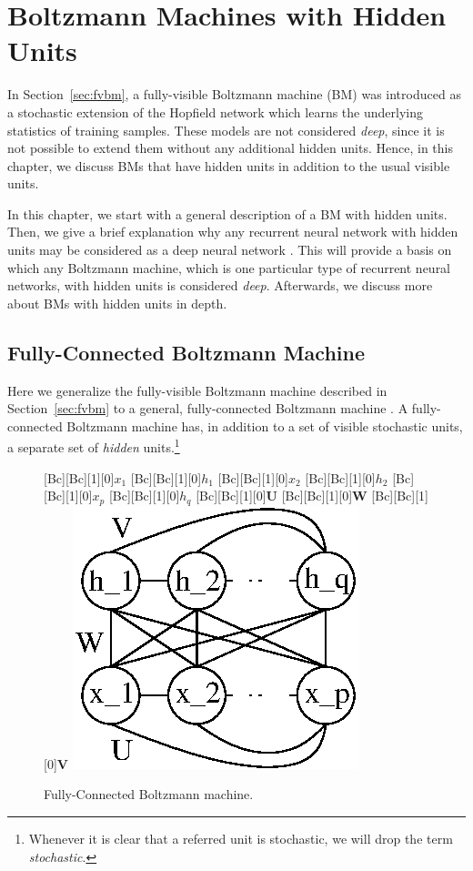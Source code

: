\documentclass{now}
\newcommand{\matr}[1]{\mathbf{#1}}
\newcommand{\mW}[0]{\matr{W}}
\newcommand{\mU}[0]{\matr{U}}
\newcommand{\mV}[0]{\matr{V}}
\begin{document}
\chapter{Boltzmann Machines with Hidden Units}
\label{chap:bm}

In Section~\ref{sec:fvbm}, a fully-visible Boltzmann machine
(BM) was introduced as a
stochastic extension of the Hopfield network which learns
the underlying statistics of training samples. These models
are not considered \textit{deep}, since it is not possible
to extend them without any additional hidden units. Hence,
in this chapter, we discuss BMs that have hidden units in
addition to the usual visible units.

In this chapter, we start with a general description of a BM
with hidden units. Then, we give  a brief explanation why
any recurrent neural network with hidden units may be
considered as a deep neural network \citep[see,
e.g.,][]{Bengio2013rec}. This will provide a basis on which
any Boltzmann machine, which is one particular type of
recurrent neural networks, with hidden units is considered
\textit{deep}. Afterwards, we discuss more about BMs with
hidden units in depth.

\section{Fully-Connected Boltzmann Machine}
\label{sec:fbm}

Here we generalize the fully-visible Boltzmann machine
described in Section~\ref{sec:fvbm} to a general,
fully-connected Boltzmann machine \citep{Ackley1985}.  A
fully-connected Boltzmann machine has, in addition to a set
of visible stochastic units, a separate set of
\textit{hidden} units.\footnote{Whenever it is clear that a
referred unit is stochastic, we will drop the term
\textit{stochastic}.} 

\begin{figure}
    \centering
    [Bc][Bc][1][0]{$x_1$}
    [Bc][Bc][1][0]{$h_1$}
    [Bc][Bc][1][0]{$x_2$}
    [Bc][Bc][1][0]{$h_2$}
    [Bc][Bc][1][0]{$x_p$}
    [Bc][Bc][1][0]{$h_q$}
    [Bc][Bc][1][0]{$\mU$}
    [Bc][Bc][1][0]{$\mW$}
    [Bc][Bc][1][0]{$\mV$}
    \includegraphics[width=0.4\columnwidth]{../figures/fbm.eps}
    \caption{Fully-Connected Boltzmann machine.}
    \label{fig:fbm}
\end{figure}
\end{document}
